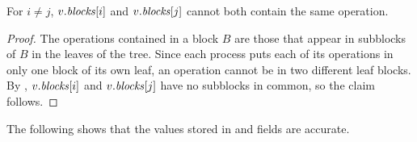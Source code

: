 \begin{corollary}\label{lem::noDuplicates}
For  $i\neq j$, $v.\mbox{\textit{blocks}}[i]$ and $v.\mbox{\textit{blocks}}[j]$ cannot both contain the same operation.
\end{corollary}
\begin{proof}
The operations contained in a block $B$ are those that appear in subblocks of $B$ in the leaves of the tree.
Since each process puts each of its operations in only one block of its own leaf, an operation 
cannot be in two different leaf blocks. 
By , $v.\mbox{\textit{blocks}}[i]$ and $v.\mbox{\textit{blocks}}[j]$ have no subblocks in common, so the claim follows.
\end{proof}



%


The following shows that the values stored in  and  fields are accurate.

